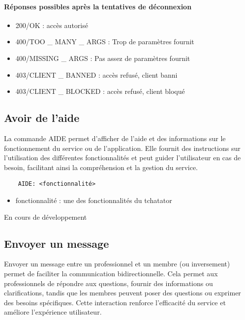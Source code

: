 \documentclass{report}
\begin{document}
\paragraph{Réponses possibles après la tentatives de déconnexion}

\begin{itemize}
	\item 200/OK : accès autorisé
	\item 400/TOO \_ MANY \_ ARGS : Trop de paramètres fournit
	\item 400/MISSING \_ ARGS : Pas assez de paramètres fournit
	\item 403/CLIENT \_ BANNED : accès refusé, client banni
	\item 403/CLIENT \_ BLOCKED : accès refusé, client bloqué
\end{itemize}

\subsection{Avoir de l’aide}

La commande AIDE permet d'afficher de l'aide et des informations sur le fonctionnement du service ou de l'application. Elle fournit des instructions sur l'utilisation des différentes fonctionnalités et peut guider l'utilisateur en cas de besoin, facilitant ainsi la compréhension et la gestion du service.

\begin{verbatim}
	AIDE: <fonctionnalité>
\end{verbatim}

\begin{itemize}
	\item fonctionnalité : une des fonctionnalités du tchatator
\end{itemize}

En cours de développement

\subsection{Envoyer un message}

Envoyer un message entre un professionnel et un membre (ou inversement) permet de faciliter la communication bidirectionnelle. Cela permet aux professionnels de répondre aux questions, fournir des informations ou clarifications, tandis que les membres peuvent poser des questions ou exprimer des besoins spécifiques. Cette interaction renforce l'efficacité du service et améliore l'expérience utilisateur.
\end{document}
